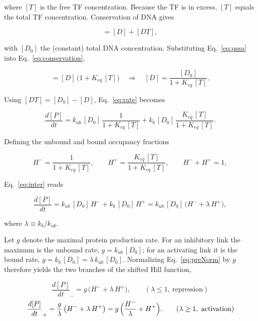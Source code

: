 \documentclass[11pt]{article}
\begin{document}
where $[T]$ is the free TF concentration. Because the TF is in excess,
$[T]$ equals the total TF concentration. Conservation of DNA gives

\begin{equation}
    [D_0] = [D] + [DT],
    \label{eq:conservation}
\end{equation}

with $[D_0]$ the (constant) total DNA concentration. Substituting
Eq.~\eqref{eq:qssa} into Eq.~\eqref{eq:conservation},

\begin{equation}
    [D_0] = [D]\,\bigl(1 + K_{eq}\,[T]\bigr)
    \quad\Longrightarrow\quad
    [D] = \frac{[D_0]}{1 + K_{eq}\,[T]}.
    \label{eq:freeDNA}
\end{equation}

Using $[DT] = [D_0] - [D]$, Eq.~\eqref{eq:rate} becomes

\begin{equation}
    \frac{d[P]}{dt}
    = k_{ub}\,[D_0]\,\frac{1}{1 + K_{eq}\,[T]}
    + k_{b}\,[D_0]\,\frac{K_{eq}\,[T]}{1 + K_{eq}\,[T]}.
    \label{eq:inter}
\end{equation}

Defining the unbound and bound occupancy fractions

\begin{equation}
    H^{-} = \frac{1}{1 + K_{eq}\,[T]},
    \qquad
    H^{+} = \frac{K_{eq}\,[T]}{1 + K_{eq}\,[T]},
    \qquad H^{-} + H^{+} = 1,
    \label{eq:Hpm}
\end{equation}

Eq.~\eqref{eq:inter} reads

\begin{equation}
    \frac{d[P]}{dt}
    = k_{ub}\,[D_0]\,H^{-} + k_{b}\,[D_0]\,H^{+}
    = k_{ub}\,[D_0]\,\bigl(H^{-} + \lambda\,H^{+}\bigr),
    \label{eq:preNorm}
\end{equation}

where $\lambda \equiv k_b / k_{ub}$.

Let $g$ denote the maximal protein production rate. For an inhibitory link the
maximum is the unbound rate, $g = k_{ub}\,[D_0]$; for an activating link it is the
bound rate, $g = k_{b}\,[D_0] = \lambda\,k_{ub}\,[D_0]$. Normalizing
Eq.~\eqref{eq:preNorm} by $g$ therefore yields the two branches of the shifted
Hill function,

\begin{equation}
    \left.\frac{d[P]}{dt}\right._{-}
        = g\,\bigl(H^{-} + \lambda\,H^{+}\bigr),
    \qquad (\lambda \le 1,\ \text{repression})
    \label{eq:branchRep}
\end{equation}
\begin{equation}
    \left.\frac{d[P]}{dt}\right._{+}
        = \frac{g}{\lambda}\,\bigl(H^{-} + \lambda\,H^{+}\bigr)
        = g\,\Bigl(\frac{H^{-}}{\lambda} + H^{+}\Bigr).
    \qquad (\lambda \ge 1,\ \text{activation})
    \label{eq:branchAct}
\end{equation}
\end{document}
